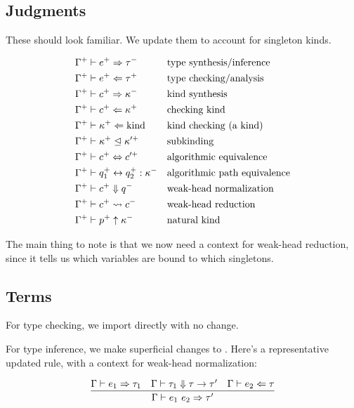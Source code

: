 
\subsection{Judgments}
These should look familiar. We update them to account for singleton kinds.

\begin{align*}
  \Gamma^+ &\vdash e^+ \Rightarrow \tau^- &&\text{type synthesis/inference}\\
  \Gamma^+ &\vdash e^+ \Leftarrow \tau^+ &&\text{type checking/analysis}\\
  \Gamma^+ &\vdash c^+ \Rightarrow \kappa^- &&\text{kind synthesis}\\
  \Gamma^+ &\vdash c^+ \Leftarrow \kappa^+ &&\text{checking kind}\\
  \Gamma^+ &\vdash \kappa^+ \Leftarrow \textnormal{kind} &&\text{kind checking (a kind)}\\
  \Gamma^+ &\vdash \kappa^+ \trianglelefteq \kappa'^+ &&\text{subkinding}\\
  \Gamma^+ &\vdash c^+ \Leftrightarrow c'^+ &&\text{algorithmic equivalence}\\
  \Gamma^+ &\vdash q_1^+ \leftrightarrow q_2^+ : \kappa^- &&\text{algorithmic path equivalence}\\
  \Gamma^+ &\vdash c^+ \Downarrow q^- &&\text{weak-head normalization}\\
  \Gamma^+ &\vdash c^+ \leadsto c^- &&\text{weak-head reduction}\\
  \Gamma^+ &\vdash p^+ \uparrow \kappa^- &&\text{natural kind}
\end{align*}

The main thing to note is that we now need a context for weak-head reduction, since
it tells us which variables are bound to which singletons.

\subsection{Terms}
For type checking, we import  directly with no change.

For type inference, we make superficial changes to . Here's a representative
updated rule, with a context for weak-head normalization:

\[ \infer{\Gamma \vdash e_1~e_2 \Rightarrow \tau'}
        {\Gamma \vdash e_1 \Rightarrow \tau_1
        &\Gamma \vdash \tau_1 \Downarrow \tau \rightarrow \tau'
        &\Gamma \vdash e_2 \Leftarrow \tau
        }
\]

